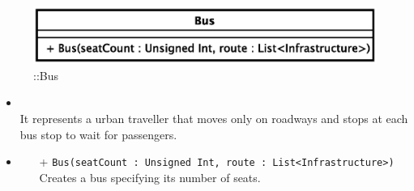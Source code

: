 \begin{figure}[h]
\centering
\includegraphics[scale=0.6,keepaspectratio]{images/solution/app/backend/bus.eps}
\caption{\pActive::Bus}
\label{fig:sd-app-bus}
\end{figure}
\FloatBarrier
\begin{itemize}
  \item \textbf{\descr} \\
It represents a urban traveller that moves only on roadways and stops at each bus stop to
wait for passengers.
\item \textbf{\ops}
  \begin{itemize}
  \item[+] \texttt{Bus(seatCount : Unsigned Int, route : List<Infrastructure>)} \\
Creates a bus specifying its number of seats.
  \end{itemize}
\end{itemize} 
